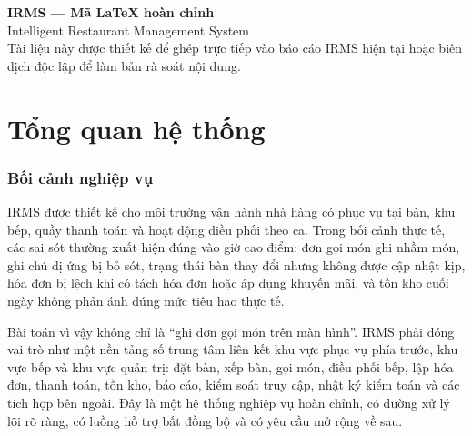 \documentclass[11pt,a4paper]{article}
\begin{document}
\begin{center}
  {\LARGE\bfseries\color{TitleBlue} IRMS --- Mã LaTeX hoàn chỉnh}\\[4pt]
  {\large Intelligent Restaurant Management System}\\[8pt]
  {\small Tài liệu này được thiết kế để ghép trực tiếp vào báo cáo IRMS hiện tại hoặc biên dịch độc lập để làm bản rà soát nội dung.}
\end{center}

\vspace{0.5em}
\tableofcontents
\newpage

\section{Tổng quan hệ thống}

\subsubsection{Bối cảnh nghiệp vụ}
IRMS được thiết kế cho môi trường vận hành nhà hàng có phục vụ tại bàn, khu bếp, quầy thanh toán và hoạt động điều phối theo ca. Trong bối cảnh thực tế, các sai sót thường xuất hiện đúng vào giờ cao điểm: đơn gọi món ghi nhầm món, ghi chú dị ứng bị bỏ sót, trạng thái bàn thay đổi nhưng không được cập nhật kịp, hóa đơn bị lệch khi có tách hóa đơn hoặc áp dụng khuyến mãi, và tồn kho cuối ngày không phản ánh đúng mức tiêu hao thực tế.

Bài toán vì vậy không chỉ là ``ghi đơn gọi món trên màn hình''. IRMS phải đóng vai trò như một nền tảng số trung tâm liên kết khu vực phục vụ phía trước, khu vực bếp và khu vực quản trị: đặt bàn, xếp bàn, gọi món, điều phối bếp, lập hóa đơn, thanh toán, tồn kho, báo cáo, kiểm soát truy cập, nhật ký kiểm toán và các tích hợp bên ngoài. Đây là một hệ thống nghiệp vụ hoàn chỉnh, có đường xử lý lõi rõ ràng, có luồng hỗ trợ bất đồng bộ và có yêu cầu mở rộng về sau.
\end{document}
